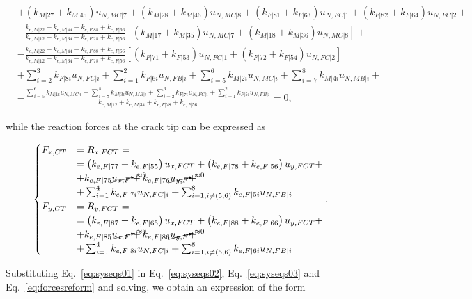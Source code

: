 \documentclass[review]{elsarticle}
\begin{document}
\begin{equation}
\begin{split}
&+\left(k_{M|27}+k_{M|45}\right)u_{N,MC|7}+\left(k_{M|28}+k_{M|46}\right)u_{N,MC|8}+\left(k_{F|81}+k_{F|63}\right)u_{N,FC|1}+\left(k_{F|82}+k_{F|64}\right)u_{N,FC|2}+\\
&-\frac{k_{e,M|22}+k_{e,M|44}+k_{e,F|88}+k_{e,F|66}}{k_{e,M|12}+k_{e,M|34}+k_{e,F|78}+k_{e,F|56}}\left[\left(k_{M|17}+k_{M|35}\right)u_{N,MC|7}+\left(k_{M|18}+k_{M|36}\right)u_{N,MC|8}\right]+\\&
-\frac{k_{e,M|22}+k_{e,M|44}+k_{e,F|88}+k_{e,F|66}}{k_{e,M|12}+k_{e,M|34}+k_{e,F|78}+k_{e,F|56}}\left[\left(k_{F|71}+k_{F|53}\right)u_{N,FC|1}+\left(k_{F|72}+k_{F|54}\right)u_{N,FC|2}\right]\\
&+\sum_{i=2}^{3}k_{F|8i}u_{N,FC|i}+\sum_{i=1}^{2}k_{F|6i}u_{N,FB|i}+\sum_{i=5}^{6}k_{M|2i}u_{N,MC|i}+\sum_{i=7}^{8}k_{M|4i}u_{N,MB|i}+\\
&-\frac{\sum_{i=5}^{6}k_{M|1i}u_{N,MC|i}+\sum_{i=7}^{8}k_{M|3i}u_{N,MB|i}+\sum_{i=2}^{3}k_{F|7i}u_{N,FC|i}+\sum_{i=1}^{2}k_{F|5i}u_{N,FB|i}}{k_{e,M|12}+k_{e,M|34}+k_{e,F|78}+k_{e,F|56}}=0,
\end{split}
\end{equation}

while the reaction forces at the crack tip can be expressed as

\begin{equation}\label{eq:forcesreform}
\begin{cases}
F_{x,CT}&=R_{x,FCT}=\\&=\left(k_{e,F|77}+k_{e,F|55}\right)u_{x,FCT}+\left(k_{e,F|78}+k_{e,F|56}\right)u_{y,FCT}+\\
&+k_{e,F|75}\cancelto{\approx 0}{u_{x,F}}+k_{e,F|76}\cancelto{\approx 0}{u_{y,F}}+\\
&+\sum_{i=1}^{4}k_{e,F|7i}u_{N,FC|i}+\sum_{i=1,i\neq\left(5,6\right)}^{8}k_{e,F|5i}u_{N,FB|i}\\
F_{y,CT}&=R_{y,FCT}=\\&=\left(k_{e,F|87}+k_{e,F|65}\right)u_{x,FCT}+\left(k_{e,F|88}+k_{e,F|66}\right)u_{y,FCT}+\\
&+k_{e,F|85}\cancelto{\approx 0}{u_{x,F}}+k_{e,F|86}\cancelto{\approx 0}{u_{y,F}}+\\
&+\sum_{i=1}^{4}k_{e,F|8i}u_{N,FC|i}+\sum_{i=1,i\neq\left(5,6\right)}^{8}k_{e,F|6i}u_{N,FB|i}\\
\end{cases}.
\end{equation}

Substituting Eq.~\ref{eq:syseqs01} in Eq.~\ref{eq:syseqs02}, Eq.~\ref{eq:syseqs03} and Eq.~\ref{eq:forcesreform} and solving, we obtain an expression of the form
\end{document}
